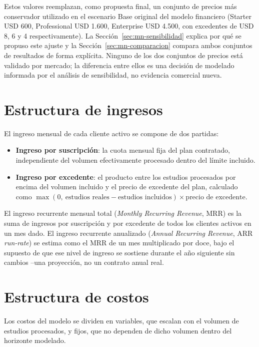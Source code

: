 Estos valores reemplazan, como propuesta final, un conjunto de precios más conservador utilizado en el escenario Base original del modelo financiero (Starter USD 600, Professional USD 1.600, Enterprise USD 4.500, con excedentes de USD 8, 6 y 4 respectivamente). La Sección~\ref{sec:mn-sensibilidad} explica por qué se propuso este ajuste y la Sección~\ref{sec:mn-comparacion} compara ambos conjuntos de resultados de forma explícita. Ninguno de los dos conjuntos de precios está validado por mercado; la diferencia entre ellos es una decisión de modelado informada por el análisis de sensibilidad, no evidencia comercial nueva.

\section{Estructura de ingresos}
\label{sec:mn-ingresos}

El ingreso mensual de cada cliente activo se compone de dos partidas:

\begin{itemize}
    \item \textbf{Ingreso por suscripción}: la cuota mensual fija del plan contratado, independiente del volumen efectivamente procesado dentro del límite incluido.
    \item \textbf{Ingreso por excedente}: el producto entre los estudios procesados por encima del volumen incluido y el precio de excedente del plan, calculado como $\max(0,\ \text{estudios reales} - \text{estudios incluidos}) \times \text{precio de excedente}$.
\end{itemize}

El ingreso recurrente mensual total (\textit{Monthly Recurring Revenue}, MRR) es la suma de ingresos por suscripción y por excedente de todos los clientes activos en un mes dado. El ingreso recurrente anualizado (\textit{Annual Recurring Revenue}, ARR \textit{run-rate}) se estima como el MRR de un mes multiplicado por doce, bajo el supuesto de que ese nivel de ingreso se sostiene durante el año siguiente sin cambios --una proyección, no un contrato anual real.

\section{Estructura de costos}
\label{sec:mn-costos}

Los costos del modelo se dividen en variables, que escalan con el volumen de estudios procesados, y fijos, que no dependen de dicho volumen dentro del horizonte modelado.

